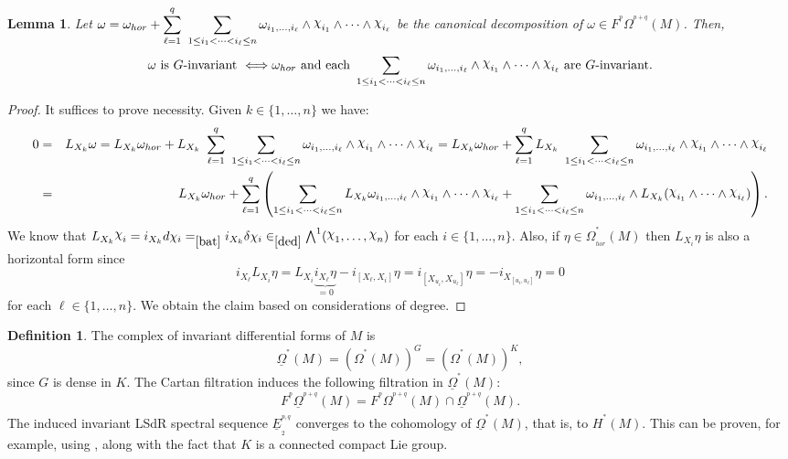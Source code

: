 \documentclass[a4paper,oneside,10pt,reqno]{amsart}
\newtheorem{lemma}[theorem]{Lemma}
\theoremstyle{definition}
\newtheorem{definition}[theorem]{Definition}
\newcommand\chii{\raise2pt\hbox{$\chi$}}
\newcommand\Om{\Omega}
\newcommand\BOm{\underline\Omega}
\newcommand\BE{\underline E}
\newcommand\om{\omega}
\newcommand{\bi}[2]{{#1}^{^{#2}}}
\newcommand{\hiru}[3]{{#1}^{^{#2}}_{_{#3}}}
\newcommand{\lau}[4]{{#1}^{^{#2}}_{_{#3}}{\left( #4 \right)}}
\newcommand{\coho}[3]{{#1}^{^{#2}}{\left( #3 \right)}}
\begin{document}
\begin{lemma}\label{inva}
Let  $\displaystyle \omega = \om_{hor} + \sum_{\ell=1}^{q} \ \sum_{1\leq i_1 < \cdots < i_\ell\leq n } \om_{i_1, \ldots,i_\ell}  \wedge \chii_{i_1} \wedge \cdots \wedge \chii_{i_\ell}   $ be the canonical decomposition of $\omega  \in \bi{F}{p}\lau{\Om}{p+q}{}{M}$.
Then,
$$
\omega \hbox{ is $G$-invariant } \Longleftrightarrow \hbox{$\omega_{hor}$ and  each } \sum_{1\leq i_1 < \cdots < i_\ell\leq n } \om_{i_1, \ldots,i_\ell}  \wedge \chii_{i_1} \wedge \cdots \wedge \chii_{i_\ell}  \hbox{ are $G$-invariant.}
$$
\end{lemma}
\begin{proof}
It suffices to prove necessity.  Given $k\in \{1,\ldots,n\}$ we have:
\begin{eqnarray*}
0&=& L_{X_k} \omega = L_{X_k} \omega_{hor} + L_{X_k} \ \sum_{\ell=1}^{q} \ \sum_{1\leq i_1 < \cdots < i_\ell\leq n } \om_{i_1, \ldots,i_\ell}  \wedge \chii_{i_1} \wedge \cdots \wedge \chii_{i_\ell} 
 =
L_{X_k} \omega_{hor} + \sum_{\ell=1}^{q}  L_{X_k} \ \sum_{1\leq i_1 < \cdots < i_\ell\leq n } \om_{i_1, \ldots,i_\ell}  \wedge \chii_{i_1} \wedge \cdots \wedge \chii_{i_\ell} 
 \\
 &=& L_{X_k} \omega_{hor} +  \sum_{\ell=1}^{q} \left(  \sum_{1\leq i_1 < \cdots < i_\ell\leq n } L_{X_k} \om_{i_1, \ldots,i_\ell}  \wedge \chii_{i_1} \wedge \cdots \wedge \chii_{i_\ell} 
 +
\sum_{1\leq i_1 < \cdots < i_\ell\leq n }\om_{i_1, \ldots,i_\ell}  \wedge  L_{X_k}  (\chii_{i_1} \wedge \cdots \wedge \chii_{i_\ell} ) \right).
\end{eqnarray*}
We know that $L_{X_k} \chii_i  = i_{X_k}d\chi_i =_{\eqref{bat}}  i_{X_k}\delta\chi_i  \in_{\eqref{ded}} \bigwedge^1(\chii_1, \ldots,\chii_n)$ for each $i\in\{1,\ldots,n\}$. Also, if $\eta \in \lau \Om * {hor} M$ then $L_{X_i} \eta$ is also a horizontal form since
$$
i_{X_\ell} L_{X_i} \eta =L_{X_i} \underbrace{i_{X_\ell} \eta}_{=0}    -i_{[X_\ell,X_i]} \eta= i_{[X_{u_i},X_{u_\ell}]} \eta = - i_{X_{[u_i,u_\ell]}} \eta =0
$$
for each $\ell \in \{1, \ldots,n\}$. 
We obtain the claim based on considerations of degree.
\end{proof}
\begin{definition}
The complex of invariant differential forms of $M$ is
$$
\coho \BOm * M = \left(\coho \Om * M\right)^G = \left(\coho \Om * M\right)^K,
$$
since $G$ is dense in $K$.
The Cartan filtration induces the following filtration in $\coho \BOm * M $:
$$
\bi{F}{p}\lau{\BOm}{p+q}{}{M}  = \bi{F}{p}\lau{\Om}{p+q}{}{M}  \cap \coho{\BOm} {p+q} M.
$$
The induced invariant LSdR spectral sequence $\hiru{\BE}{p,q}{2} $ converges to the cohomology of $\coho \BOm * M $, that is, to
$\coho H  * M $. This can be proven,
for example, using \cite[Chap. 4, Sec. 1, Theorem I]{MR0336651}, along with the fact that $K$ is a connected compact Lie group.
\end{definition}
\end{document}
